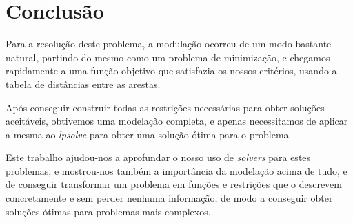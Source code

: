 \chapter{Conclusão}
Para a resolução deste problema, a modulação ocorreu de um modo bastante natural, partindo do mesmo como um problema de minimização, e chegamos rapidamente a uma função objetivo que satisfazia os nossos critérios, usando a tabela de distâncias entre as arestas. 

Após conseguir construir todas as restrições necessárias para obter soluções aceitáveis, obtivemos uma modelação completa, e apenas necessitamos de aplicar a mesma ao \emph{lpsolve} para obter uma solução ótima para o problema.

Este trabalho ajudou-nos a aprofundar o nosso uso de \emph{solvers} para estes problemas, e mostrou-nos também a importância da modelação acima de tudo, e de conseguir transformar um problema em funções e restrições que o descrevem concretamente e sem perder nenhuma informação, de modo a conseguir obter soluções ótimas para problemas mais complexos.